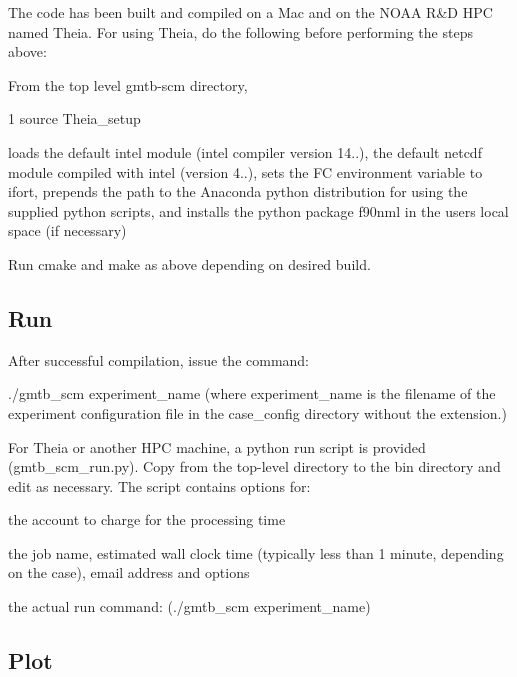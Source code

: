 The code has been built and compiled on a Mac and on the N\+O\+AA R\&D H\+PC named Theia. For using Theia, do the following before performing the steps above\+:
\begin{DoxyItemize}
\item From the top level gmtb-\/scm directory,
\begin{DoxyCode}
1 source Theia\_setup 
\end{DoxyCode}
 loads the default intel module (intel compiler version 14..), the default netcdf module compiled with intel (version 4..), sets the FC environment variable to \textquotesingle{}ifort\textquotesingle{}, prepends the path to the Anaconda python distribution for using the supplied python scripts, and installs the python package \textquotesingle{}f90nml\textquotesingle{} in the user\textquotesingle{}s local space (if necessary)
\item Run cmake and make as above depending on desired build. 
\end{DoxyItemize}\hypertarget{index_Run}{}\subsection{Run}\label{index_Run}

\begin{DoxyItemize}
\item After successful compilation, issue the command\+:
\begin{DoxyItemize}
\item ./gmtb\+\_\+scm experiment\+\_\+name (where experiment\+\_\+name is the filename of the experiment configuration file in the case\+\_\+config directory without the extension.)
\end{DoxyItemize}
\item For Theia or another H\+PC machine, a python run script is provided (gmtb\+\_\+scm\+\_\+run.\+py). Copy from the top-\/level directory to the bin directory and edit as necessary. The script contains options for\+:
\begin{DoxyItemize}
\item the account to charge for the processing time
\item the job name, estimated wall clock time (typically less than 1 minute, depending on the case), email address and options
\item the actual run command\+: (./gmtb\+\_\+scm experiment\+\_\+name) 
\end{DoxyItemize}
\end{DoxyItemize}\hypertarget{index_Plot}{}\subsection{Plot}\label{index_Plot}

